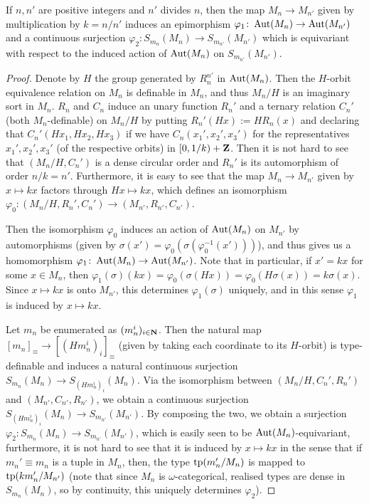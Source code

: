 	
	\begin{prop}
		\label{prop:connecting_maps_nn'}
		If $n,n'$ are positive integers and $n'$ divides $n$, then the map $M_n\to M_{n'}$ given by multiplication by $k=n/n'$ induces an epimorphism $\varphi_1\colon \operatorname{{Aut}}(M_n)\to\operatorname{{Aut}}(M_{n'})$ and a continuous surjection $\varphi_2\colon S_{m_n}(M_n)\to S_{m_{n'}}(M_{n'})$ which is equivariant with respect to the induced action of $\operatorname{{Aut}}(M_n)$ on $S_{m_{n'}}(M_{n'})$.
	\end{prop}
	\begin{proof}
		
		Denote by $H$ the group generated by $R_n^{n'}$ in $\operatorname{{Aut}}(M_n)$. Then the $H$-orbit equivalence relation on $M_n$ is definable in $M_n$, and thus $M_n/H$ is an imaginary sort in $M_n$. $R_n$ and $C_n$ induce an unary function $R_n'$ and a ternary relation $C_n'$ (both $M_n$-definable) on $M_n/H$ by putting $R_n'(Hx):=HR_n(x)$ and declaring that $C_n'(Hx_1,Hx_2,Hx_3)$ if we have $C_n(x_1',x_2',x_3')$ for the representatives $x_1',x_2',x_3'$ (of the respective orbits) in $[0,1/k)+{\mathbf{Z}}$. Then it is not hard to see that $(M_n/H,C_n')$ is a dense circular order and $R_n'$ is its automorphism of order $n/k=n'$. Furthermore, it is easy to see that the map $M_n\to M_{n'}$ given by $x\mapsto kx$ factors through $Hx\mapsto kx$, which defines an isomorphism $\varphi_0\colon (M_n/H,R_n',C_n')\to(M_{n'},R_{n'},C_{n'})$.
		
		Then the isomorphism $\varphi_0$ induces an action of $\operatorname{{Aut}}(M_n)$ on $M_{n'}$ by automorphisms (given by $\sigma(x')=\varphi_0(\sigma(\varphi_0^{-1}(x')))$), and thus gives us a homomorphism $\varphi_1\colon \operatorname{{Aut}}(M_n)\to \operatorname{{Aut}}(M_{n'})$. Note that in particular, if $x'=kx$ for some $x\in M_n$, then $\varphi_1(\sigma)(kx)=\varphi_0(\sigma(Hx))=\varphi_0(H\sigma(x))=k\sigma(x)$. Since $x\mapsto kx$ is onto $M_{n'}$, this determines $\varphi_1(\sigma)$ uniquely, and in this sense $\varphi_1$ is induced by $x\mapsto kx$.
		
		Let $m_n$ be enumerated as $(m_n^i)_{i\in {\mathbf{N}}}$. Then the natural map $[m_n]_{\equiv}\to [(Hm_n^i)_i]_{\equiv}$ (given by taking each coordinate to its $H$-orbit) is type-definable and induces a natural continuous surjection $S_{m_n}(M_n)\to S_{(Hm_n^i)_i}(M_n)$. Via the isomorphism between $(M_n/H,C_n',R_n')$ and $(M_{n'},C_{n'},R_{n'})$, we obtain a continuous surjection $S_{(Hm_n^i)_i}(M_n)\to S_{m_{n'}}(M_{n'})$. By composing the two, we obtain a surjection $\varphi_2\colon S_{m_n}(M_n)\to S_{m_{n'}}(M_{n'})$, which is easily seen to be $\operatorname{{Aut}}(M_n)$-equivariant, furthermore, it is not hard to see that it is induced by $x\mapsto kx$ in the sense that if $m_n'\equiv m_n$ is a tuple in $M_n$, then, the type $\operatorname{{tp}}(m_n'/M_n)$ is mapped to $\operatorname{{tp}}(km_n'/M_{n'})$ (note that since $M_n$ is $\omega$-categorical, realised types are dense in $S_{m_n}(M_n)$, so by continuity, this uniquely determines $\varphi_2$).
		

\end{proof}
